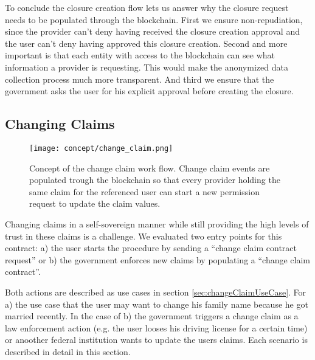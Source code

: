 To conclude the closure creation flow lets us answer why the closure request needs to be populated through the blockchain. First we ensure non-repudiation, since the provider can't deny having received the closure creation approval and the user can't deny having approved this closure creation. Second and more important is that each entity with access to the blockchain can see what information a provider is requesting. This would make the anonymized data collection process much more transparent. And third we ensure that the government asks the user for his explicit approval before creating the closure.

\subsection{Changing Claims}

\begin{figure}
 \texttt{[image: concept/change\_claim.png]}
 \centering
\caption{Concept of the change claim work flow. Change claim events are populated trough the blockchain so that every provider holding the same claim for the referenced user can start a new permission request to update the claim values.}
\label{fig:changeClaimsFig}
\end{figure}

Changing claims in a self-sovereign manner while still providing the high levels of trust in these claims is a challenge. We evaluated two entry points for this contract: a) the user starts the procedure by sending a “change claim contract request” or b) the government enforces new claims by populating a “change claim contract”.

Both actions are described as use cases in section \ref{sec:changeClaimUseCase}. For a) the use case that the user may want to change his family name because he got married recently. In the case of b) the government triggers a change claim as a law enforcement action (e.g. the user looses his driving license for a certain time) or anoother federal institution wants to update the users claims. Each scenario is described in detail in this section.


